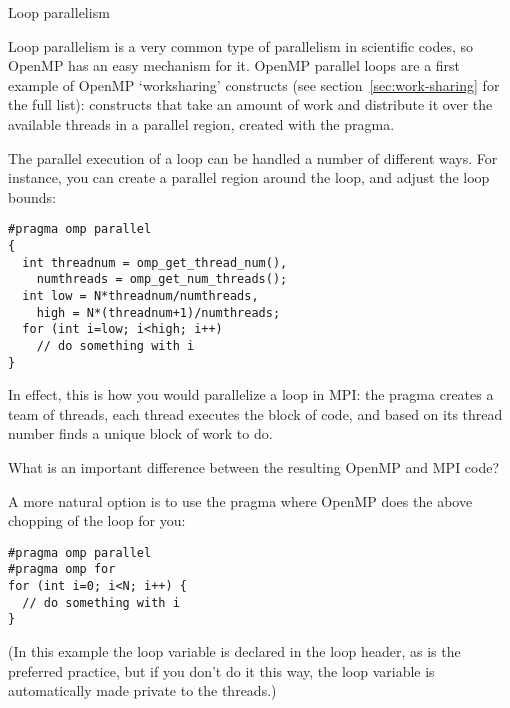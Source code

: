 
 {Loop parallelism}
\label{sec:omp-for}

Loop parallelism is a very common type of parallelism in scientific
codes, so OpenMP has an easy mechanism for it.
OpenMP parallel loops are a first example of OpenMP `worksharing'
constructs (see section~\ref{sec:work-sharing} for the full list):
constructs that take an amount of work and distribute it over the
available threads in a parallel region,
created with the  pragma.

The parallel execution of a loop can be handled a number of different ways.
For instance, you can create a parallel region around the loop, and
adjust the loop bounds:
\begin{lstlisting}
#pragma omp parallel
{
  int threadnum = omp_get_thread_num(),
    numthreads = omp_get_num_threads();
  int low = N*threadnum/numthreads,
    high = N*(threadnum+1)/numthreads;
  for (int i=low; i<high; i++)
    // do something with i
}
\end{lstlisting}
In effect, this is how you would parallelize a loop in MPI:
the  pragma creates a team of threads,
each thread executes the block of code,
and based on its thread number finds a unique block of work to do.

\begin{exercise}
  What is an important difference between the resulting OpenMP and MPI code?
\end{exercise}

A more natural option is to use the
 pragma
where OpenMP does the above chopping of the loop
for you:
\begin{lstlisting}
#pragma omp parallel
#pragma omp for
for (int i=0; i<N; i++) {
  // do something with i
}
\end{lstlisting}
(In this example the loop variable is declared in the loop header,
as is the preferred practice, but if you don't do it this way,
the loop variable is automatically made private to the threads.)

